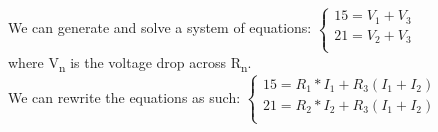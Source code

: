 \documentclass[12pt,letterpaper]{article}
\begin{document}
We can generate and solve a system of equations:
$\begin{cases}
15 = V_{1} + V_{3} \\
21 = V_{2} + V_{3} \\
\end{cases}$ \\

where V\textsubscript{n} is the voltage drop across R\textsubscript{n}. \\

We can rewrite the equations as such:
$\begin{cases}
15 = R_{1}*I_{1} + R_{3}(I_{1}+I_{2}) \\
21 = R_{2}*I_{2} + R_{3}(I_{1}+I_{2})\\
\end{cases}$
\end{document}
